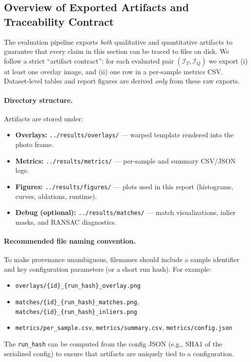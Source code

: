 
\subsection{Overview of Exported Artifacts and Traceability Contract}
The evaluation pipeline exports \emph{both} qualitative and quantitative artifacts to guarantee that every claim in this section can be traced to files on disk. We follow a strict ``artifact contract'': for each evaluated pair $(\mathcal{I}_T,\mathcal{I}_Q)$ we export (i) at least one overlay image, and (ii) one row in a per-sample metrics CSV. Dataset-level tables and report figures are derived \emph{only} from these raw exports.

\paragraph{Directory structure.}
Artifacts are stored under:
\begin{itemize}
  \item \textbf{Overlays:} \texttt{../results/overlays/} --- warped template rendered into the photo frame.
  \item \textbf{Metrics:} \texttt{../results/metrics/} --- per-sample and summary CSV/JSON logs.
  \item \textbf{Figures:} \texttt{../results/figures/} --- plots used in this report (histograms, curves, ablations, runtime).
  \item \textbf{Debug (optional):} \texttt{../results/matches/} --- match visualizations, inlier masks, and RANSAC diagnostics.
\end{itemize}

\paragraph{Recommended file naming convention.}
To make provenance unambiguous, filenames should include a sample identifier and key configuration parameters (or a short run hash). For example:
\begin{itemize}
  \item \texttt{overlays/\{id\}\_\{run\_hash\}\_overlay.png}
  \item \texttt{matches/\{id\}\_\{run\_hash\}\_matches.png}, \texttt{matches/\{id\}\_\{run\_hash\}\_inliers.png}
  \item \texttt{metrics/per\_sample.csv}, \texttt{metrics/summary.csv}, \texttt{metrics/config.json}
\end{itemize}
The \texttt{run\_hash} can be computed from the config JSON (e.g., SHA1 of the serialized config) to ensure that artifacts are uniquely tied to a configuration.

